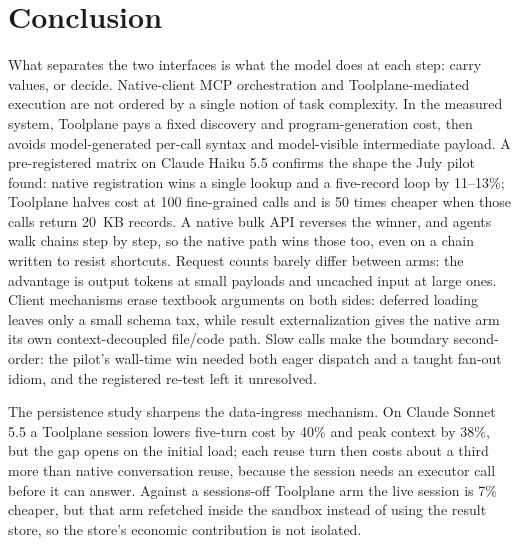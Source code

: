 \documentclass[10pt,twocolumn]{article}
\begin{document}
\section{Conclusion}

What separates the two interfaces is what the model does at each step: carry
values, or decide.  Native-client MCP orchestration and Toolplane-mediated
execution are not ordered by a single notion of task complexity.  In the measured system,
Toolplane pays a fixed discovery and program-generation cost, then avoids
model-generated per-call syntax and model-visible intermediate payload.  A
pre-registered matrix on Claude Haiku 5.5 confirms the shape the July pilot
found: native registration wins a single lookup and a five-record loop by
11--13\%; Toolplane halves cost at 100 fine-grained calls and is 50 times
cheaper when those calls return 20~KB records.  A native bulk API reverses
the winner, and agents walk chains step by step, so the native path wins
those too, even on a chain written to resist shortcuts.  Request counts barely
differ between arms: the advantage is output tokens at small payloads and
uncached input at large ones.  Client mechanisms erase textbook arguments on
both sides: deferred loading leaves only a small schema tax, while result
externalization gives the native arm its own context-decoupled file/code path.
Slow calls make the boundary second-order: the pilot's wall-time win needed both
eager dispatch and a taught fan-out idiom, and the registered re-test left it
unresolved.

The persistence study sharpens the data-ingress mechanism.  On Claude Sonnet
5.5 a Toolplane session lowers five-turn cost by 40\% and peak context by 38\%,
but the gap opens on the initial load; each reuse turn then costs about a third
more than native conversation reuse, because the session needs an executor
call before it can answer.  Against a sessions-off Toolplane arm the live
session is 7\% cheaper, but that arm refetched inside the sandbox instead of
using the result store, so the store's economic contribution is not isolated.
\end{document}
